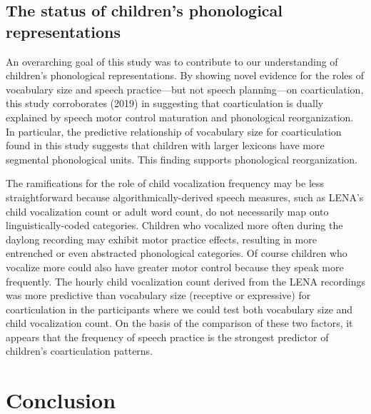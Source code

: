 \documentclass[a4paper,man,natbib,donotrepeattitle, apacite]{apa6}
\begin{document}
\subsection{The status of children’s phonological representations}

An overarching goal of this study was to contribute to our understanding of children’s phonological representations. By showing novel evidence for the roles of vocabulary size and speech practice---but not speech planning---on coarticulation, this study corroborates \citeauthor{noiraySpokenLanguageDevelopment2019} (2019) in suggesting that coarticulation is dually explained by speech motor control maturation and phonological reorganization. In particular, the predictive relationship of vocabulary size for coarticulation found in this study suggests that children with larger lexicons have more segmental phonological units. This finding supports phonological reorganization. 

The ramifications for the role of child vocalization frequency may be less straightforward because algorithmically-derived speech measures, such as LENA’s child vocalization count or adult word count, do not necessarily map onto linguistically-coded categories. Children who vocalized more often during the daylong recording may exhibit motor practice effects, resulting in more entrenched or even abstracted phonological categories. Of course children who vocalize more could also have greater motor control because they speak more frequently. The hourly child vocalization count derived from the LENA recordings was more predictive than vocabulary size (receptive or expressive) for coarticulation in the participants where we could test both vocabulary size and child vocalization count. On the basis of the comparison of these two factors, it appears that the frequency of speech practice is the strongest predictor of children’s coarticulation patterns. 

\section{Conclusion}
\end{document}
